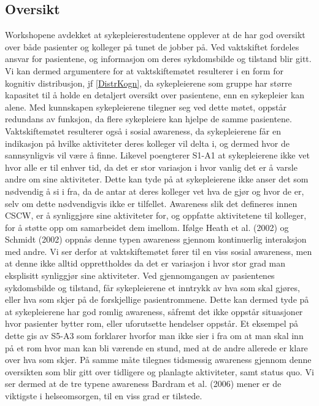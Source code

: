 \subsection{Oversikt}
\label{oversikt}
Workshopene avdekket at sykepleierestudentene opplever at de har god oversikt over både pasienter og kolleger på tunet de jobber på. Ved vaktskiftet fordeles ansvar for pasientene, og informasjon om deres sykdomsbilde og tilstand blir gitt. Vi kan dermed argumentere for at vaktskiftemøtet resulterer i en form for kognitiv distribusjon, jf \ref{DistrKogn}, da sykepleierene som gruppe har større kapasitet til å holde en detaljert oversikt over pasientene, enn en sykepleier kan alene. Med kunnskapen sykepleierene tilegner seg ved dette møtet, oppstår redundans av funksjon, da flere sykepleiere kan hjelpe de samme pasientene. Vaktskiftemøtet resulterer også i sosial awareness, da sykepleierene får en indikasjon på hvilke aktiviteter deres kolleger vil delta i, og dermed hvor de sannsynligvis vil være å finne. Likevel poengterer S1-A1 at sykepleierene ikke vet hvor alle er til enhver tid, da det er stor variasjon i hvor vanlig det er å varsle andre om sine aktiviteter. Dette kan tyde på at sykepleierene ikke anser det som nødvendig å si i fra, da de antar at deres kolleger vet hva de gjør og hvor de er, selv om dette nødvendigvis ikke er tilfellet. Awareness slik det defineres innen CSCW, er å synliggjøre sine aktiviteter for, og oppfatte aktivitetene til kolleger, for å støtte opp om samarbeidet dem imellom. Ifølge Heath et al. (2002) og Schmidt (2002) oppnås denne typen awareness gjennom kontinuerlig interaksjon med andre. Vi ser derfor at vaktskiftemøtet fører til en viss sosial awareness, men at denne ikke alltid opprettholdes da det er variasjon i hvor stor grad man eksplisitt synliggjør sine aktiviteter. Ved gjennomgangen av pasientenes sykdomsbilde og tilstand, får sykepleierene et inntrykk av  hva som skal gjøres, eller hva som skjer på de forskjellige pasientrommene. Dette kan dermed tyde på at sykepleierene har god romlig awareness, såfremt det ikke oppstår situasjoner hvor pasienter bytter rom, eller uforutsette hendelser oppstår. Et eksempel på dette gis av S5-A3 som forklarer hvorfor man ikke sier i fra om at man skal inn på et rom hvor man kan bli værende en stund, med at de andre allerede er klare over hva som skjer. På samme måte tilegnes tidsmessig awareness gjennom denne oversikten som blir gitt over tidligere og planlagte aktiviteter, samt status quo. Vi ser dermed at de tre typene awareness Bardram et al. (2006) mener er de viktigste i helseomsorgen, til en viss grad er tilstede.

